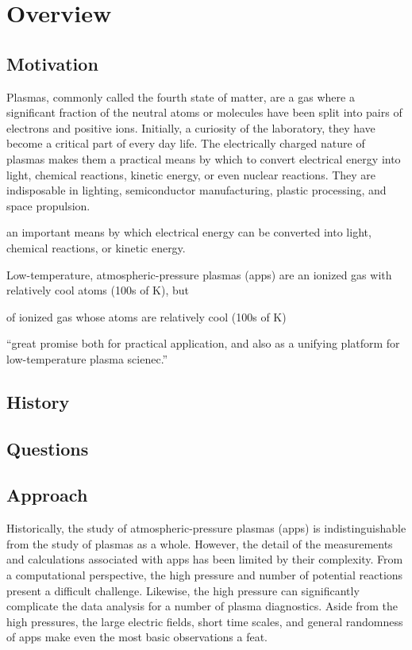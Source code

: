 \section{Overview}

\subsection{Motivation}
Plasmas, commonly called the fourth state of matter, are a gas where a
significant fraction of the neutral atoms or molecules have been split into
pairs of electrons and positive ions. Initially, a curiosity of the laboratory,
they have become a critical part of every day life. The electrically charged
nature of plasmas makes them a practical means by which to convert electrical
energy into light, chemical reactions, kinetic energy, or even nuclear
reactions. They are indisposable in lighting, semiconductor manufacturing,
plastic processing, and space propulsion.

an important means by
which electrical energy can be converted into light, chemical reactions, or
kinetic energy. 


Low-temperature, atmospheric-pressure plasmas (\acs{app}s) are an ionized gas
with relatively cool atoms (100s of K), but 

of
ionized gas whose atoms are relatively cool (100s of K)

``great promise
both for practical application, and also as a unifying platform for
low-temperature plasma scienec.'' \cite{NA2007} 

\subsection{History}

\subsection{Questions}

\subsection{Approach}

Historically, the study of atmospheric-pressure plasmas (\acs{app}s) is
indistinguishable from the study of plasmas as a whole. However, the detail of
the measurements and calculations associated with \acs{app}s has been limited
by their complexity. From a computational perspective, the high pressure and
number of potential reactions present a difficult challenge. Likewise, the high
pressure can significantly complicate the data analysis for a number of plasma
diagnostics. Aside from the high pressures, the large electric fields, short
time scales, and general randomness of \acs{app}s make even the most basic
observations a feat.

